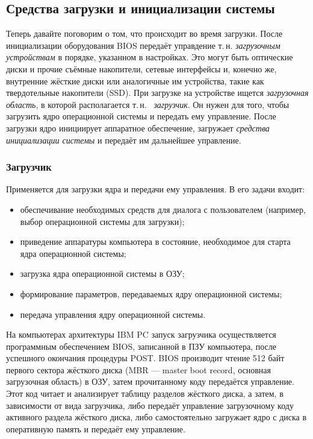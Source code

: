 \subsection{Средства загрузки и инициализации системы}\label{base:os:structure:bootandinit}
 Теперь давайте поговорим о том, что происходит во время загрузки. После инициализации оборудования BIOS передаёт управдение т.\,н. \emph{загрузочным устройствам} в порядке, указанном в настройках. Это могут быть оптические диски и прочие съёмные накопители, сетевые интерфейсы и, конечно же, внутренние жёсткие диски или аналогичные им устройства, такие как твердотельные накопители (SSD).
 При загрузке на устройстве ищется \emph{загрузочная область}, в которой располагается т.\,н.~ \emph{загрузчик}. Он нужен для того, чтобы загрузить ядро операционной системы и передать ему управление. После загрузки ядро инициирует аппаратное обеспечение, загружает \emph{средства инициализации системы} и передаёт им дальнейшее управление.
 
 \subsubsection{Загрузчик}\label{base:os:structure:bootandinit:bootloader}
 Применяется для загрузки ядра и передачи ему управления. В его задачи входит:
 \begin{itemize}
  \item обеспечивание необходимых средств для диалога с пользователем (например, выбор операционной системы для загрузки);
  \item приведение аппаратуры компьютера в состояние, необходимое для старта ядра операционной системы;
  \item загрузка ядра операционной системы в ОЗУ;
  \item формирование параметров, передаваемых ядру операционной системы;
  \item передача управления ядру операционной системы.
 \end{itemize}
  На компьютерах архитектуры IBM PC запуск загрузчика осуществляется программным обеспечением BIOS, записанной в ПЗУ компьютера, после успешного окончания процедуры POST. BIOS производит чтение 512 байт первого сектора жёсткого диска (MBR --- master boot record, основная загрузочная область) в ОЗУ, затем прочитанному коду передаётся управление.
  Этот код читает и анализирует таблицу разделов жёсткого диска, а затем, в зависимости от вида загрузчика, либо передаёт управление загрузочному коду активного раздела жёсткого диска, либо самостоятельно загружает ядро с диска в оперативную память и передаёт ему управление.
  
